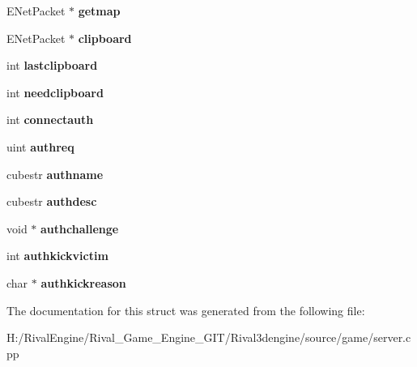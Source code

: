 \begin{DoxyCompactItemize}
\item 
\mbox{\label{structserver_1_1clientinfo_afe90c90631889918528cd92efca6bd74}} 
E\+Net\+Packet $\ast$ {\bfseries getmap}
\item 
\mbox{\label{structserver_1_1clientinfo_a9b361c429e68884cde9c7489af43e366}} 
E\+Net\+Packet $\ast$ {\bfseries clipboard}
\item 
\mbox{\label{structserver_1_1clientinfo_a3250512af682e86a507d65767cccdb33}} 
int {\bfseries lastclipboard}
\item 
\mbox{\label{structserver_1_1clientinfo_ab8a50a8d6060a012441eb5e265179a73}} 
int {\bfseries needclipboard}
\item 
\mbox{\label{structserver_1_1clientinfo_ae9bf281b7742705a23ffec8cbc67e290}} 
int {\bfseries connectauth}
\item 
\mbox{\label{structserver_1_1clientinfo_a5acab1da73faeaab8661d660f8440e29}} 
uint {\bfseries authreq}
\item 
\mbox{\label{structserver_1_1clientinfo_ad53b41b38baa0fbdd93e135c88c3a348}} 
cubestr {\bfseries authname}
\item 
\mbox{\label{structserver_1_1clientinfo_ae424791dd7324173d9599ad4e7a47fe6}} 
cubestr {\bfseries authdesc}
\item 
\mbox{\label{structserver_1_1clientinfo_adfbba599ef870c7abab914b5a8bfa4a5}} 
void $\ast$ {\bfseries authchallenge}
\item 
\mbox{\label{structserver_1_1clientinfo_a7328f0d7bb6dd93df11a82ab864be89a}} 
int {\bfseries authkickvictim}
\item 
\mbox{\label{structserver_1_1clientinfo_a74b689c598a29ac26e9a8535cf9fd7cb}} 
char $\ast$ {\bfseries authkickreason}
\end{DoxyCompactItemize}


The documentation for this struct was generated from the following file\+:\begin{DoxyCompactItemize}
\item 
H\+:/\+Rival\+Engine/\+Rival\+\_\+\+Game\+\_\+\+Engine\+\_\+\+G\+I\+T/\+Rival3dengine/source/game/server.\+cpp\end{DoxyCompactItemize}
